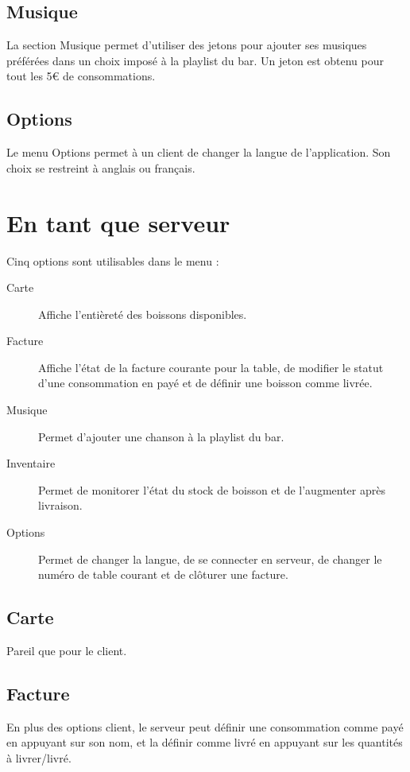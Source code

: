 \documentclass[a4paper,11pt]{article}
\begin{document}
\subsection{Musique}

La section Musique permet d'utiliser des jetons pour ajouter ses musiques préférées dans un choix imposé à la playlist du bar. Un jeton est obtenu pour tout les 5\euro{} de consommations.

\subsection{Options}

Le menu Options permet à un client de changer la langue de l'application. Son choix se restreint à anglais ou français.


\pagebreak
\section{En tant que serveur}

Cinq options sont utilisables dans le menu :

\begin{description}
	\item[Carte] Affiche l'entièreté des boissons disponibles.
	\item[Facture] Affiche l'état de la facture courante pour la table, de modifier le statut d'une consommation en payé et de définir une boisson comme livrée.
	\item[Musique] Permet d'ajouter une chanson à la playlist du bar.
	\item[Inventaire] Permet de monitorer l'état du stock de boisson et de l'augmenter après livraison.
	\item[Options] Permet de changer la langue, de se connecter en serveur, de changer le numéro de table courant et de clôturer une facture.
\end{description}

\subsection{Carte}	
Pareil que pour le client.
\subsection{Facture}
En plus des options client, le serveur peut définir une consommation comme payé en appuyant sur son nom, et la définir comme livré en appuyant sur les quantités à livrer/livré.
\end{document}
